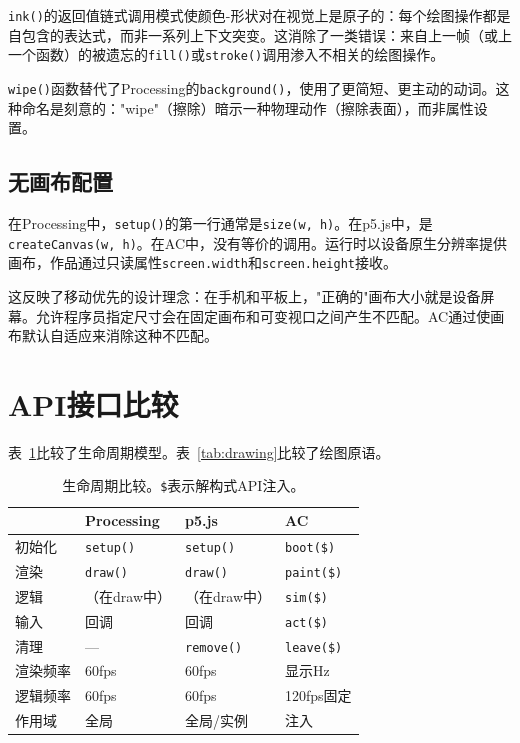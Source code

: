 \documentclass[10pt,letterpaper,twocolumn]{article}
\begin{document}
\texttt{ink()}的返回值链式调用模式使颜色-形状对在视觉上是原子的：每个绘图操作都是自包含的表达式，而非一系列上下文突变。这消除了一类错误：来自上一帧（或上一个函数）的被遗忘的\texttt{fill()}或\texttt{stroke()}调用渗入不相关的绘图操作。

\texttt{wipe()}函数替代了Processing的\texttt{background()}，使用了更简短、更主动的动词。这种命名是刻意的："wipe"（擦除）暗示一种物理动作（擦除表面），而非属性设置。

\subsection{无画布配置}

在Processing中，\texttt{setup()}的第一行通常是\texttt{size(w, h)}。在p5.js中，是\texttt{createCanvas(w, h)}。在AC中，没有等价的调用。运行时以设备原生分辨率提供画布，作品通过只读属性\texttt{screen.width}和\texttt{screen.height}接收。

这反映了移动优先的设计理念：在手机和平板上，"正确的"画布大小就是设备屏幕。允许程序员指定尺寸会在固定画布和可变视口之间产生不匹配。AC通过使画布默认自适应来消除这种不匹配。


\section{API接口比较}
\label{sec:comparison}

表~\ref{tab:lifecycle}比较了生命周期模型。表~\ref{tab:drawing}比较了绘图原语。

\begin{table}[h]
\small
\centering
\begin{tabularx}{\columnwidth}{lXXX}
\toprule
 & \textbf{Processing} & \textbf{p5.js} & \textbf{AC} \\
\midrule
初始化 & \texttt{setup()} & \texttt{setup()} & \texttt{boot(\$)} \\
渲染 & \texttt{draw()} & \texttt{draw()} & \texttt{paint(\$)} \\
逻辑 & （在draw中） & （在draw中） & \texttt{sim(\$)} \\
输入 & 回调 & 回调 & \texttt{act(\$)} \\
清理 & --- & \texttt{remove()} & \texttt{leave(\$)} \\
\midrule
渲染频率 & 60fps & 60fps & 显示Hz \\
逻辑频率 & 60fps & 60fps & 120fps固定 \\
作用域 & 全局 & 全局/实例 & 注入 \\
\bottomrule
\end{tabularx}
\caption{生命周期比较。\texttt{\$}表示解构式API注入。}
\label{tab:lifecycle}
\end{table}
\end{document}
